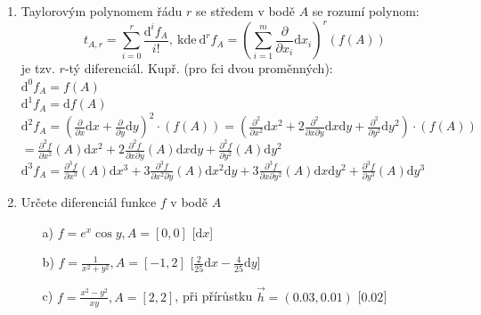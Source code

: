 \begin{enumerate}
\item Taylorovým polynomem řádu $r$ se středem v bodě $A$ se rozumí polynom:
$$
t_{A,r} = \sum_{i=0}^r \frac{\mathrm{d}^i f_A}{i!}
\mathrm{, ~ kde ~ }
\mathrm{d}^r f_A = \left( \sum_{i=1}^m \frac{\partial}{\partial x_i} \mathrm{d}x_i \right)^r (f(A))
$$
je tzv. $r$-tý diferenciál. Kupř. (pro fci dvou proměnných):
\\$\mathrm{d}^0 f_A = f(A)$
\\$\mathrm{d}^1 f_A = \mathrm{d} f(A)$
\\$\mathrm{d}^2 f_A = (\frac{\partial}{\partial x} \mathrm{d}x
                     + \frac{\partial}{\partial y} \mathrm{d}y)^2
                     \cdot(f(A))
                    = (\frac{\partial^2}{\partial x^2} \mathrm{d}x^2
                     +2\frac{\partial^2}{\partial x \partial y} 
                       \mathrm{d}x \mathrm{d}y
                     + \frac{\partial^2}{\partial y^2} \mathrm{d}y^2)
                     \cdot(f(A))
                     $
\\$                 = \frac{\partial^2 f}{\partial x^2} (A) \mathrm{d}x^2
                    +2\frac{\partial^2 f}{\partial x \partial y} (A)
                        \mathrm{d}x \mathrm{d}y
                    + \frac{\partial^2 f}{\partial y^2} (A) \mathrm{d}y^2
                     $
\\$\mathrm{d}^3 f_A = \frac{\partial^3 f}{\partial x^3} (A) \mathrm{d}x^3
                    +3\frac{\partial^3 f}{\partial x^2 \partial y} (A)
                        \mathrm{d}x^2  \mathrm{d}y
                    +3\frac{\partial^3 f}{\partial x \partial y^2} (A)
                        \mathrm{d}x \mathrm{d}y^2     
                    + \frac{\partial^3 f}{\partial y^3} (A) \mathrm{d}y^3
                     $
                     
                     
\item Určete diferenciál funkce $f$ v bodě $A$
\begin{enumerate}
    \item[a)] $f=e^x\cos{y},A=[0,0]$ \hspace{\fill} [$\mathrm{d}x$] 
    \item[b)] $f=\frac{1}{x^2+y^2},A=[-1,2]$ \hspace{\fill} [$\frac{2}{25}\mathrm{d}x-\frac{4}{25}\mathrm{d}y$]
    \item[c)] $f=\frac{x^2-y^2}{xy},A=[2,2]$, při přírůstku $\vec{h}=(0.03,0.01)$ \hspace{\fill} [$0.02$]
\end{enumerate}


\end{enumerate}
